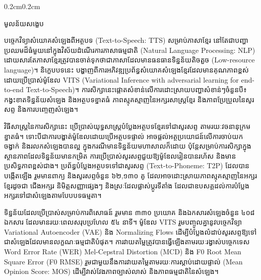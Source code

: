 \setlength{\parskip}{0.5em}
\linespread{1.5}\selectfont
\begin{adjustwidth}{0.2cm}{0.2cm}

    \begin{center}
        {\khmerfont\fontsize{15pt}{25pt}\selectfont មូលន័យសង្ខេប \par}
    \end{center}
    \label{khmer-abstract}
    \vspace{0.5cm}
    \khmernormal
    \small
    បច្ចេកវិទ្យាសំយោគសំឡេងពីអត្ថបទ 
    {\englishfont\fontsize{13.5pt}{20pt}\selectfont (Text-to-Speech: TTS)} 
    សម្រាប់ភាសាខ្មែរ នៅតែជាបញ្ហាប្រឈមដ៏ធំមួយនៅក្នុងវិស័យដំណើរការភាសាធម្មជាតិ 
    {\englishfont\fontsize{13.5pt}{20pt}\selectfont (Natural Language Processing: NLP)} 
    ដោយសារតែភាសាខ្មែរត្រូវបានចាត់ទុកថាជាភាសាដែលមានធនធានទិន្នន័យតិចតួច 
    {\englishfont\fontsize{13.5pt}{20pt}\selectfont (Low-resource language)}។ 
    និក្ខេបបទនេះ បង្ហាញពីការអភិវឌ្ឍប្រព័ន្ធសំយោគសំឡេងខ្មែរដែលមានគុណភាពខ្ពស់ 
    ដោយប្រើប្រាស់ម៉ូឌែល 
    {\englishfont\fontsize{13.5pt}{20pt}\selectfont VITS (Variational Inference with adversarial learning for end-to-end Text-to-Speech)}។ 
    ការសិក្សានេះផ្ដោតសំខាន់លើការដោះស្រាយបញ្ហាសំខាន់ៗចំនួនបី៖ 
    កង្វះខាតទិន្នន័យសំឡេង និងអត្ថបទខ្នាតធំ 
    ភាពស្មុគស្មាញនៃអក្សរសាស្ត្រខ្មែរ 
    និងភាពប្រែប្រួលនៃសូរសព្ទ និងការបញ្ចេញសំឡេង។

    វិធីសាស្ត្រនៃការសិក្សានេះ ប្រើប្រាស់យុទ្ធសាស្ត្របំប្លែងអត្ថបទខ្មែរទៅជាសូរសព្ទ 
    តាមរយៈវចនានុក្រមខ្នាតធំ។ 
    ទោះបីជាការបង្ហាត់ម៉ូឌែលដោយប្រើអត្ថបទផ្ទាល់ 
    អាចផ្ដល់អត្ថប្រយោជន៍លើការចាប់យកចង្វាក់ និងរលកសំឡេងបានល្អ 
    ក្នុងករណីមានទិន្នន័យមហាសាលក៏ដោយ 
    ប៉ុន្តែសម្រាប់ការសិក្សាក្នុងស្ថានភាពដែលទិន្នន័យមានកម្រិត 
    ការប្រើប្រាស់សូរសព្ទជួយឱ្យម៉ូឌែលរៀនបានរហ័ស 
    និងមានប្រសិទ្ធភាពខ្ពស់ជាង។ 
    ប្រព័ន្ធបំប្លែងអត្ថបទទៅជាសូរសព្ទ 
    {\englishfont\fontsize{13.5pt}{20pt}\selectfont (Text-to-Phoneme: T2P)} 
    ដែលបានបង្កើតឡើង រួមមានពាក្យ និងសូរសព្ទចំនួន ៦២,១៣០ គូ 
    ដែលអាចដោះស្រាយភាពស្មុគស្មាញនៃអក្សរខ្មែរដូចជា 
    ជើងអក្សរ និមិត្តសញ្ញាផ្សេងៗ 
    និងស្រៈដែលផ្លាស់ប្តូរទីតាំង 
    ដែលជាឧបសគ្គដល់ការបំប្លែងអក្សរទៅជាសំឡេងតាមបែបបទធម្មតា។

    ទិន្នន័យដែលប្រើប្រាស់សម្រាប់ការពិសោធន៍ 
    រួមមាន ៣៣០ ប្រយោគ និងឯកសារសំឡេងចំនួន ៤០៨ ឯកសារ 
    ដែលមានរយៈពេលសរុបប្រហែល ៥៤ នាទី។ 
    ម៉ូឌែល 
    {\englishfont\fontsize{13.5pt}{20pt}\selectfont VITS} 
    រួមបញ្ចូលគ្នានូវបច្ចេកវិទ្យា 
    {\englishfont\fontsize{13.5pt}{20pt}\selectfont Variational Autoencoder (VAE)} 
    និង 
    {\englishfont\fontsize{13.5pt}{20pt}\selectfont Normalizing Flows} 
    ដើម្បីបំប្លែងលំដាប់សូរសព្ទឱ្យទៅជាសំឡេងដែលមានលក្ខណៈធម្មជាតិបំផុត។ 
    ការវាយតម្លៃត្រូវបានធ្វើឡើងតាមរយៈរង្វាស់បច្ចេកទេស 
    {\englishfont\fontsize{13.5pt}{20pt}\selectfont Word Error Rate (WER)} 
    {\englishfont\fontsize{13.5pt}{20pt}\selectfont Mel-Cepstral Distortion (MCD)} 
    និង 
    {\englishfont\fontsize{13.5pt}{20pt}\selectfont F0 Root Mean Square Error (F0 RMSE)} 
    រួមជាមួយនឹងការវាយតម្លៃតាមរយៈការស្ដាប់ដោយផ្ទាល់ 
    {\englishfont\fontsize{13.5pt}{20pt}\selectfont (Mean Opinion Score: MOS)} 
    ដើម្បីវាស់វែងភាពច្បាស់លាស់ 
    និងភាពធម្មជាតិនៃសំឡេង។


\end{adjustwidth}
